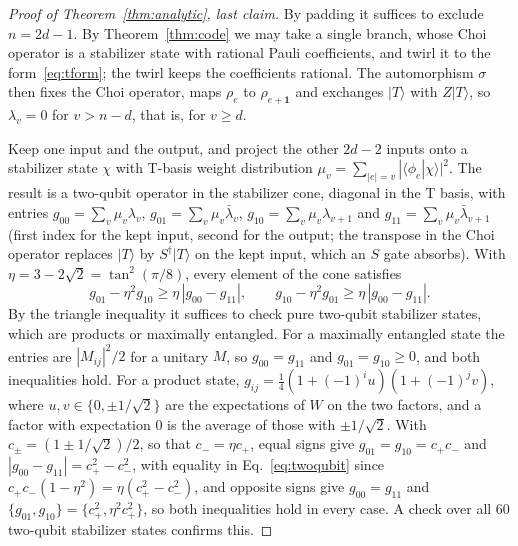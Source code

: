 \documentclass[aps,prl,reprint,twocolumn,amsmath,amssymb,floatfix,nofootinbib,superscriptaddress]{revtex4-2}
\begin{document}
\begin{proof}[Proof of Theorem~\ref{thm:analytic}, last claim]
By padding it suffices to exclude $n=2d-1$. By Theorem~\ref{thm:code} we may take a single branch, whose Choi operator is a stabilizer state with rational Pauli coefficients, and twirl it to the form~\eqref{eq:tform}; the twirl keeps the coefficients rational. The automorphism $\sigma$ then fixes the Choi operator, maps $\rho_e$ to $\rho_{e+\mathbf1}$ and exchanges $|T\rangle$ with $Z|T\rangle$, so $\lambda_v=0$ for $v>n-d$, that is, for $v\geq d$.

Keep one input and the output, and project the other $2d-2$ inputs onto a stabilizer state $\chi$ with T-basis weight distribution $\mu_v=\sum_{|e|=v}|\langle\phi_e|\chi\rangle|^2$. The result is a two-qubit operator in the stabilizer cone, diagonal in the T basis, with entries $g_{00}=\sum_v\mu_v\lambda_v$, $g_{01}=\sum_v\mu_v\bar\lambda_v$, $g_{10}=\sum_v\mu_v\lambda_{v+1}$ and $g_{11}=\sum_v\mu_v\bar\lambda_{v+1}$ (first index for the kept input, second for the output; the transpose in the Choi operator replaces $|T\rangle$ by $S^\dagger|T\rangle$ on the kept input, which an $S$ gate absorbs). With $\eta=3-2\sqrt2=\tan^2(\pi/8)$, every element of the cone satisfies
\begin{equation}
 g_{01}-\eta^2g_{10}\geq\eta\,|g_{00}-g_{11}|,\qquad g_{10}-\eta^2g_{01}\geq\eta\,|g_{00}-g_{11}|.
 \label{eq:twoqubit}
\end{equation}
By the triangle inequality it suffices to check pure two-qubit stabilizer states, which are products or maximally entangled. For a maximally entangled state the entries are $|M_{ij}|^2/2$ for a unitary $M$, so $g_{00}=g_{11}$ and $g_{01}=g_{10}\geq0$, and both inequalities hold. For a product state, $g_{ij}=\tfrac14(1+(-1)^iu)(1+(-1)^jv)$, where $u,v\in\{0,\pm1/\sqrt2\}$ are the expectations of $W$ on the two factors, and a factor with expectation 0 is the average of those with $\pm1/\sqrt2$. With $c_\pm=(1\pm1/\sqrt2)/2$, so that $c_-=\eta c_+$, equal signs give $g_{01}=g_{10}=c_+c_-$ and $|g_{00}-g_{11}|=c_+^2-c_-^2$, with equality in Eq.~\eqref{eq:twoqubit} since $c_+c_-(1-\eta^2)=\eta(c_+^2-c_-^2)$, and opposite signs give $g_{00}=g_{11}$ and $\{g_{01},g_{10}\}=\{c_+^2,\eta^2c_+^2\}$, so both inequalities hold in every case. A check over all 60 two-qubit stabilizer states confirms this.


\end{proof}
\end{document}
